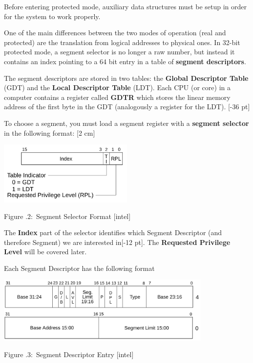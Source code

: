 \documentclass[twoside]{article}
\newcounter{lecnum}
\renewcommand{\cite}[1]{[#1]}
\newcommand{\fig}[3]{
            \vspace{#2}
            \begin{center}
            Figure \thelecnum.#1:~#3
            \end{center}
    }
\begin{document}
Before entering protected mode, auxiliary data structures must be setup in order for the system to work properly.

One of the main differences between the two modes of operation (real and protected) are the translation from logical addresses to physical ones. In 32-bit protected mode, a segment selector is no longer a raw number, but instead it contains an index pointing to a 64 bit entry in a table of \textbf{segment descriptors}.

The segment descriptors are stored in two tables: the \textbf{Global Descriptor Table} (GDT) and the \textbf{Local Descriptor Table} (LDT). Each CPU (or core) in a computer contains a register called \textbf{GDTR} which stores the linear memory address of the first byte in the GDT (analogously a register for the LDT). [-36 pt]

To choose a segment, you must load a segment register with a \textbf{segment selector} in the following format: [2 cm]

\begin{center}
  \includegraphics[width=0.5\textwidth]{segsel.png}
  \fig{2}{0 pt}{Segment Selector Format \cite{intel}}
\end{center}

The \textbf{Index} part of the selector identifies which Segment Descriptor (and therefore Segment) we are interested in[-12 pt]. The \textbf{Requested Privilege Level} will be covered later.

Each Segment Descriptor has the following format

\begin{center}
  \includegraphics[width=0.8\textwidth]{segdesc.png}
  \fig{3}{0 pt}{Segment Descriptor Entry \cite{intel}}
\end{center}
\end{document}
